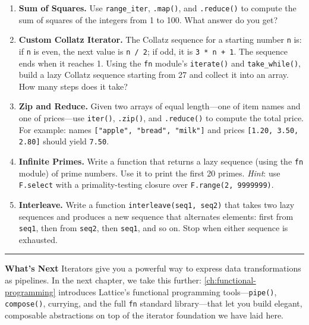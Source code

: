 \begin{enumerate}
  \item \textbf{Sum of Squares.}
    Use \lstinline|range_iter|, \lstinline|.map()|, and \lstinline|.reduce()| to compute the sum of squares of the integers from 1 to 100.
    What answer do you get?

  \item \textbf{Custom Collatz Iterator.}
    The Collatz sequence for a starting number \lstinline|n| is: if \lstinline|n| is even, the next value is \lstinline|n / 2|; if odd, it is \lstinline|3 * n + 1|.
    The sequence ends when it reaches 1.
    Using the \lstinline|fn| module's \lstinline|iterate()| and \lstinline|take_while()|, build a lazy Collatz sequence starting from 27 and collect it into an array.
    How many steps does it take?

  \item \textbf{Zip and Reduce.}
    Given two arrays of equal length---one of item names and one of prices---use \lstinline|iter()|, \lstinline|.zip()|, and \lstinline|.reduce()| to compute the total price.
    For example: names \lstinline|["apple", "bread", "milk"]| and prices \lstinline|[1.20, 3.50, 2.80]| should yield \lstinline|7.50|.

  \item \textbf{Infinite Primes.}
    Write a function that returns a lazy sequence (using the \lstinline|fn| module) of prime numbers.
    Use it to print the first 20 primes.
    \emph{Hint}: use \lstinline|F.select| with a primality-testing closure over \lstinline|F.range(2, 9999999)|.

  \item \textbf{Interleave.}
    Write a function \lstinline|interleave(seq1, seq2)| that takes two lazy sequences and produces a new sequence that alternates elements: first from \lstinline|seq1|, then from \lstinline|seq2|, then \lstinline|seq1|, and so on.
    Stop when either sequence is exhausted.
\end{enumerate}

\bigskip
\begin{center}\rule{0.5\linewidth}{0.4pt}\end{center}
\medskip

\noindent\textbf{What's Next}\quad
Iterators give you a powerful way to express data transformations as pipelines.
In the next chapter, we take this further: \cref{ch:functional-programming} introduces Lattice's functional programming tools---\lstinline|pipe()|, \lstinline|compose()|, currying, and the full \lstinline|fn| standard library---that let you build elegant, composable abstractions on top of the iterator foundation we have laid here.
